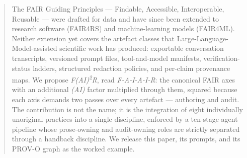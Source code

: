 \begin{abstract}
The FAIR Guiding Principles --- Findable, Accessible, Interoperable,
Reusable --- were drafted for data and have since been extended to
research software (FAIR4RS) and machine-learning models (FAIR4ML).
Neither extension yet covers the artefact classes that
Large-Language-Model-assisted scientific work has produced: exportable
conversation transcripts, versioned prompt files, tool-and-model
manifests, verification-status ladders, structured redaction policies,
and per-claim provenance maps. We propose
\emph{F(AI)\textsuperscript{2}R}, read \emph{F-A-I-A-I-R}: the canonical
FAIR axes with an additional \emph{(AI)} factor multiplied through them,
squared because each axis demands two passes over every artefact ---
authoring and audit. The contribution is not the name; it is the
integration of eight individually unoriginal practices into a single
discipline, enforced by a ten-stage agent pipeline whose prose-owning
and audit-owning roles are strictly separated through a handback
discipline. We release this paper, its prompts, and its PROV-O graph as
the worked example.
\end{abstract}
